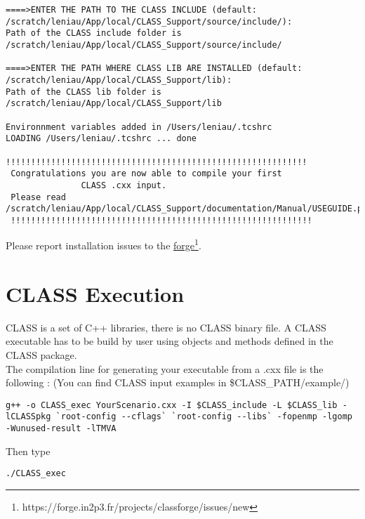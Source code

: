 \begin{center}
\begin{minipage}{\textwidth}
\begin{lstlisting}[style=terminal]
====>ENTER THE PATH TO THE CLASS INCLUDE (default: /scratch/leniau/App/local/CLASS_Support/source/include/): 
Path of the CLASS include folder is /scratch/leniau/App/local/CLASS_Support/source/include/

====>ENTER THE PATH WHERE CLASS LIB ARE INSTALLED (default: /scratch/leniau/App/local/CLASS_Support/lib): 
Path of the CLASS lib folder is /scratch/leniau/App/local/CLASS_Support/lib

Environnment variables added in /Users/leniau/.tcshrc
LOADING /Users/leniau/.tcshrc ... done

!!!!!!!!!!!!!!!!!!!!!!!!!!!!!!!!!!!!!!!!!!!!!!!!!!!!!!!!!!!!
 Congratulations you are now able to compile your first     
               CLASS .cxx input.                            
 Please read /scratch/leniau/App/local/CLASS_Support/documentation/Manual/USEGUIDE.pdf
 !!!!!!!!!!!!!!!!!!!!!!!!!!!!!!!!!!!!!!!!!!!!!!!!!!!!!!!!!!!!
\end{lstlisting}
\end{minipage}
\end{center}

Please report installation issues to the \href{https://forge.in2p3.fr/projects/classforge/issues/new}{forge}\footnote{https://forge.in2p3.fr/projects/classforge/issues/new}.

\chapter{CLASS Execution}
CLASS is a set of C++ libraries, there is no CLASS binary file. A CLASS executable has to be build by user using objects and methods defined in the CLASS package. \\
The compilation line for generating your executable from a .cxx file is the following :
(You can find CLASS input examples in \$CLASS\_PATH/example/)

\begin{center}
\begin{minipage}{\textwidth}
\begin{lstlisting}[style=terminal]
g++ -o CLASS_exec YourScenario.cxx -I $CLASS_include -L $CLASS_lib -lCLASSpkg `root-config --cflags` `root-config --libs` -fopenmp -lgomp -Wunused-result -lTMVA
\end{lstlisting}
\end{minipage}
\end{center}
Then type 
\begin{center}
\begin{minipage}{\textwidth}
\begin{lstlisting}[style=terminal]
./CLASS_exec
\end{lstlisting}
\end{minipage}
\end{center}


